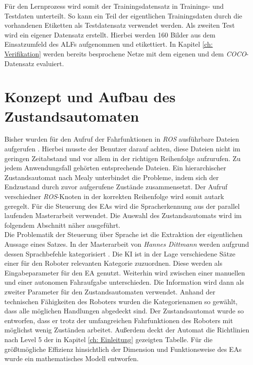 		Für den Lernprozess wird somit der Trainingsdatensatz in Trainings- und Testdaten unterteilt. So kann ein Teil der eigentlichen Trainingsdaten durch die vorhandenen Etiketten als Testdatensatz verwendet werden. Als zweiten Test wird ein eigener Datensatz erstellt. Hierbei werden 160 Bilder aus dem Einsatzumfeld des ALFs aufgenommen und etikettiert. In Kapitel \ref{ch: Verifikation} werden bereits besprochene Netze mit dem eigenen und dem \textit{COCO}-Datensatz evaluiert.
		
	\section{Konzept und Aufbau des Zustandsautomaten}
	\label{sec: Umsetzung der Statemachine}
	Bisher wurden für den Aufruf der Fahrfunktionen in \textit{ROS} ausführbare Dateien aufgerufen \cite{Bachelorarbeit}. Hierbei musste der Benutzer darauf achten, diese Dateien nicht im geringen Zeitabstand und vor allem in der richtigen Reihenfolge aufzurufen. Zu jedem Anwendungsfall gehörten entsprechende Dateien. Ein hierarchischer Zustandsautomat nach Mealy unterbindet die Probleme, indem sich der Endzustand durch zuvor aufgerufene Zustände zusammensetzt. Der Aufruf verschiedner \textit{ROS}-Knoten in der korrekten Reihenfolge wird somit autark geregelt. Für die Steuerung des EAs wird die Spracherkennung aus der parallel laufenden Masterarbeit verwendet. Die Auswahl des Zustandsautomats wird im folgendem Abschnitt näher ausgeführt.\\	
	
	Die Problematik der Steuerung über Sprache ist die Extraktion der eigentlichen Aussage eines Satzes. In der Masterarbeit von \textit{Hannes Dittmann} werden aufgrund dessen Sprachbefehle kategorisiert \cite{Dittmann}. Die KI ist in der Lage verschiedene Sätze einer für den Roboter relevanten Kategorie zuzuordnen. Diese werden als Eingabeparameter für den EA genutzt. Weiterhin wird zwischen einer manuellen und einer autonomen Fahraufgabe unterschieden. Die Information wird dann als zweiter Parameter für den Zustandsautomaten verwendet. Anhand der technischen Fähigkeiten des Roboters wurden die Kategorienamen so gewählt, dass alle möglichen Handlungen abgedeckt sind. Der Zustandsautomat wurde so entworfen, dass er trotz der umfangreichen Fahrfunktionen des Roboters mit möglichst wenig Zuständen arbeitet. Außerdem deckt der Automat die Richtlinien nach Level 5 der in Kapitel \ref{ch: Einleitung} gezeigten Tabelle. Für die größtmögliche Effizienz hinsichtlich der Dimension und Funktionsweise des EAs wurde ein mathematisches Modell entworfen.\\
	
